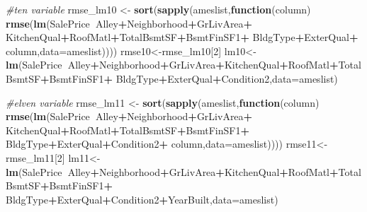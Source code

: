 \documentclass[]{article}
\newenvironment{Shaded}{\begin{snugshade}}{\end{snugshade}}
\newcommand{\CommentTok}[1]{\textcolor[rgb]{0.56,0.35,0.01}{\textit{#1}}}
\newcommand{\ControlFlowTok}[1]{\textcolor[rgb]{0.13,0.29,0.53}{\textbf{#1}}}
\newcommand{\DataTypeTok}[1]{\textcolor[rgb]{0.13,0.29,0.53}{#1}}
\newcommand{\DecValTok}[1]{\textcolor[rgb]{0.00,0.00,0.81}{#1}}
\newcommand{\KeywordTok}[1]{\textcolor[rgb]{0.13,0.29,0.53}{\textbf{#1}}}
\newcommand{\NormalTok}[1]{#1}
\newcommand{\OperatorTok}[1]{\textcolor[rgb]{0.81,0.36,0.00}{\textbf{#1}}}
\newcommand{\StringTok}[1]{\textcolor[rgb]{0.31,0.60,0.02}{#1}}
\begin{document}
\begin{Shaded}
\begin{Highlighting}[]
\CommentTok{#ten variable}
\NormalTok{rmse_lm10 <-}\StringTok{ }\KeywordTok{sort}\NormalTok{(}\KeywordTok{sapply}\NormalTok{(ameslist,}\ControlFlowTok{function}\NormalTok{(column) }\KeywordTok{rmse}\NormalTok{(}\KeywordTok{lm}\NormalTok{(SalePrice}\OperatorTok{~}\NormalTok{Alley}\OperatorTok{+}\NormalTok{Neighborhood}\OperatorTok{+}\NormalTok{GrLivArea}\OperatorTok{+}
\StringTok{                                                            }\NormalTok{KitchenQual}\OperatorTok{+}\NormalTok{RoofMatl}\OperatorTok{+}\NormalTok{TotalBsmtSF}\OperatorTok{+}\NormalTok{BsmtFinSF1}\OperatorTok{+}
\StringTok{                                                            }\NormalTok{BldgType}\OperatorTok{+}\NormalTok{ExterQual}\OperatorTok{+}
\StringTok{                                                            }\NormalTok{column,}\DataTypeTok{data=}\NormalTok{ameslist))))}
\NormalTok{rmse10<-rmse_lm10[}\DecValTok{2}\NormalTok{]}
\NormalTok{lm10<-}\KeywordTok{lm}\NormalTok{(SalePrice}\OperatorTok{~}\NormalTok{Alley}\OperatorTok{+}\NormalTok{Neighborhood}\OperatorTok{+}\NormalTok{GrLivArea}\OperatorTok{+}\NormalTok{KitchenQual}\OperatorTok{+}\NormalTok{RoofMatl}\OperatorTok{+}\NormalTok{TotalBsmtSF}\OperatorTok{+}\NormalTok{BsmtFinSF1}\OperatorTok{+}
\StringTok{           }\NormalTok{BldgType}\OperatorTok{+}\NormalTok{ExterQual}\OperatorTok{+}\NormalTok{Condition2,}\DataTypeTok{data=}\NormalTok{ameslist)}

\CommentTok{#elven variable}
\NormalTok{rmse_lm11 <-}\StringTok{ }\KeywordTok{sort}\NormalTok{(}\KeywordTok{sapply}\NormalTok{(ameslist,}\ControlFlowTok{function}\NormalTok{(column) }\KeywordTok{rmse}\NormalTok{(}\KeywordTok{lm}\NormalTok{(SalePrice}\OperatorTok{~}\NormalTok{Alley}\OperatorTok{+}\NormalTok{Neighborhood}\OperatorTok{+}\NormalTok{GrLivArea}\OperatorTok{+}
\StringTok{                                                             }\NormalTok{KitchenQual}\OperatorTok{+}\NormalTok{RoofMatl}\OperatorTok{+}\NormalTok{TotalBsmtSF}\OperatorTok{+}\NormalTok{BsmtFinSF1}\OperatorTok{+}
\StringTok{                                                             }\NormalTok{BldgType}\OperatorTok{+}\NormalTok{ExterQual}\OperatorTok{+}\NormalTok{Condition2}\OperatorTok{+}
\StringTok{                                                             }\NormalTok{column,}\DataTypeTok{data=}\NormalTok{ameslist))))}
\NormalTok{rmse11<-rmse_lm11[}\DecValTok{2}\NormalTok{]}
\NormalTok{lm11<-}\KeywordTok{lm}\NormalTok{(SalePrice}\OperatorTok{~}\NormalTok{Alley}\OperatorTok{+}\NormalTok{Neighborhood}\OperatorTok{+}\NormalTok{GrLivArea}\OperatorTok{+}\NormalTok{KitchenQual}\OperatorTok{+}\NormalTok{RoofMatl}\OperatorTok{+}\NormalTok{TotalBsmtSF}\OperatorTok{+}\NormalTok{BsmtFinSF1}\OperatorTok{+}
\StringTok{           }\NormalTok{BldgType}\OperatorTok{+}\NormalTok{ExterQual}\OperatorTok{+}\NormalTok{Condition2}\OperatorTok{+}\NormalTok{YearBuilt,}\DataTypeTok{data=}\NormalTok{ameslist)}


\end{Highlighting}
\end{Shaded}
\end{document}
